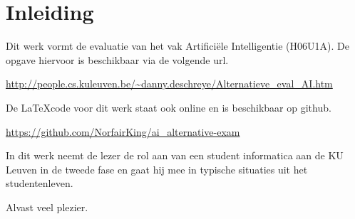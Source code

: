 \documentclass[alternative-exam.tex]{subfiles}
\begin{document}
\chapter*{Inleiding}
Dit werk vormt de evaluatie van het vak Artifici\"ele Intelligentie (H06U1A). De opgave hiervoor is beschikbaar via de volgende url.
\begin{center}
\url{http://people.cs.kuleuven.be/~danny.deschreye/Alternatieve_eval_AI.htm}
\end{center}
\noindent De \LaTeX code voor dit werk staat ook online en is beschikbaar op github.
\begin{center}
\url{https://github.com/NorfairKing/ai_alternative-exam}
\end{center}
In dit werk neemt de lezer de rol aan van een student informatica aan de KU Leuven in de tweede fase en gaat hij mee in typische situaties uit het studentenleven.

\vspace{1cm}
\noindent Alvast veel plezier.
\end{document}
